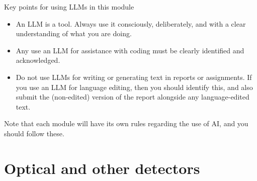\documentclass{tufte-book}
\begin{document}
\begin{tcolorbox}[sharp corners=all, colback=white!75!red]
Key points for using LLMs in this module
\begin{itemize}   
\item An LLM is a tool. Always use it consciously, deliberately, and with a clear understanding of what you are doing.
\item Any use an LLM for assistance with coding must be clearly identified and acknowledged.
\item Do not use LLMs for writing or generating text in reports or assignments. If you use an LLM for language editing, then you should identify this, and also submit the (non-edited) version of the report alongside any language-edited text.
\end{itemize}
Note that each module will have its own rules regarding the use of AI, and you should follow these.
\end{tcolorbox} 













\chapter{Optical and other detectors}

\end{document}
